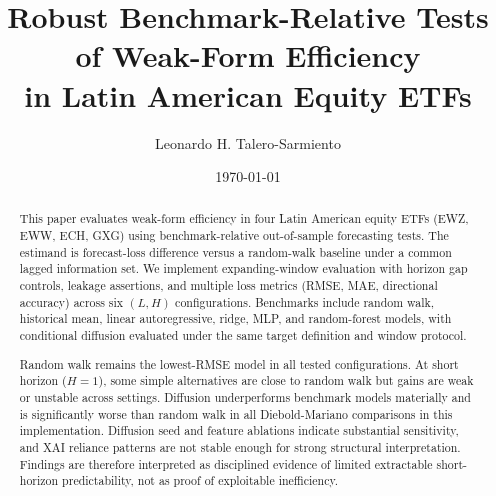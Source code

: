 \documentclass[11pt]{article}
\title{Robust Benchmark-Relative Tests of Weak-Form Efficiency\\
in Latin American Equity ETFs}
\author{Leonardo H. Talero-Sarmiento}
\date{\today}
\begin{document}
\onehalfspacing
\maketitle

\begin{abstract}
This paper evaluates weak-form efficiency in four Latin American equity ETFs (EWZ, EWW, ECH, GXG) using benchmark-relative out-of-sample forecasting tests. The estimand is forecast-loss difference versus a random-walk baseline under a common lagged information set. We implement expanding-window evaluation with horizon gap controls, leakage assertions, and multiple loss metrics (RMSE, MAE, directional accuracy) across six $(L,H)$ configurations. Benchmarks include random walk, historical mean, linear autoregressive, ridge, MLP, and random-forest models, with conditional diffusion evaluated under the same target definition and window protocol.

Random walk remains the lowest-RMSE model in all tested configurations. At short horizon ($H=1$), some simple alternatives are close to random walk but gains are weak or unstable across settings. Diffusion underperforms benchmark models materially and is significantly worse than random walk in all Diebold-Mariano comparisons in this implementation. Diffusion seed and feature ablations indicate substantial sensitivity, and XAI reliance patterns are not stable enough for strong structural interpretation. Findings are therefore interpreted as disciplined evidence of limited extractable short-horizon predictability, not as proof of exploitable inefficiency.
\end{abstract}









\appendix




\end{document}
